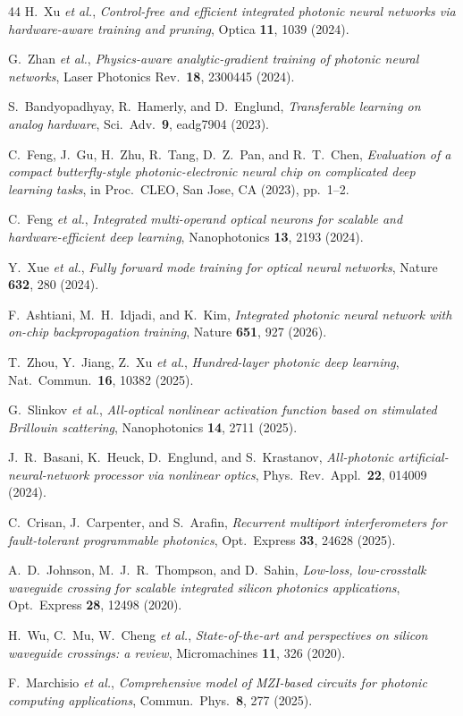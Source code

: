 \documentclass[11pt,a4paper]{article}
\begin{document}
\begin{thebibliography}{44}
H.~Xu \textit{et al.},
\textit{Control-free and efficient integrated photonic neural networks via hardware-aware training and pruning},
Optica \textbf{11}, 1039 (2024).

G.~Zhan \textit{et al.},
\textit{Physics-aware analytic-gradient training of photonic neural networks},
Laser Photonics Rev.\ \textbf{18}, 2300445 (2024).

S.~Bandyopadhyay, R.~Hamerly, and D.~Englund,
\textit{Transferable learning on analog hardware},
Sci.\ Adv.\ \textbf{9}, eadg7904 (2023).

C.~Feng, J.~Gu, H.~Zhu, R.~Tang, D.~Z.~Pan, and R.~T.~Chen,
\textit{Evaluation of a compact butterfly-style photonic-electronic neural chip on complicated deep learning tasks},
in Proc.\ CLEO, San Jose, CA (2023), pp.~1--2.

C.~Feng \textit{et al.},
\textit{Integrated multi-operand optical neurons for scalable and hardware-efficient deep learning},
Nanophotonics \textbf{13}, 2193 (2024).

Y.~Xue \textit{et al.},
\textit{Fully forward mode training for optical neural networks},
Nature \textbf{632}, 280 (2024).

F.~Ashtiani, M.~H.~Idjadi, and K.~Kim,
\textit{Integrated photonic neural network with on-chip backpropagation training},
Nature \textbf{651}, 927 (2026).

T.~Zhou, Y.~Jiang, Z.~Xu \textit{et al.},
\textit{Hundred-layer photonic deep learning},
Nat.\ Commun.\ \textbf{16}, 10382 (2025).

G.~Slinkov \textit{et al.},
\textit{All-optical nonlinear activation function based on stimulated Brillouin scattering},
Nanophotonics \textbf{14}, 2711 (2025).

J.~R.~Basani, K.~Heuck, D.~Englund, and S.~Krastanov,
\textit{All-photonic artificial-neural-network processor via nonlinear optics},
Phys.\ Rev.\ Appl.\ \textbf{22}, 014009 (2024).

C.~Crisan, J.~Carpenter, and S.~Arafin,
\textit{Recurrent multiport interferometers for fault-tolerant programmable photonics},
Opt.\ Express \textbf{33}, 24628 (2025).

A.~D.~Johnson, M.~J.~R.~Thompson, and D.~Sahin,
\textit{Low-loss, low-crosstalk waveguide crossing for scalable integrated silicon photonics applications},
Opt.\ Express \textbf{28}, 12498 (2020).

H.~Wu, C.~Mu, W.~Cheng \textit{et al.},
\textit{State-of-the-art and perspectives on silicon waveguide crossings: a review},
Micromachines \textbf{11}, 326 (2020).

F.~Marchisio \textit{et al.},
\textit{Comprehensive model of MZI-based circuits for photonic computing applications},
Commun.\ Phys.\ \textbf{8}, 277 (2025).

\end{thebibliography}
\end{document}
